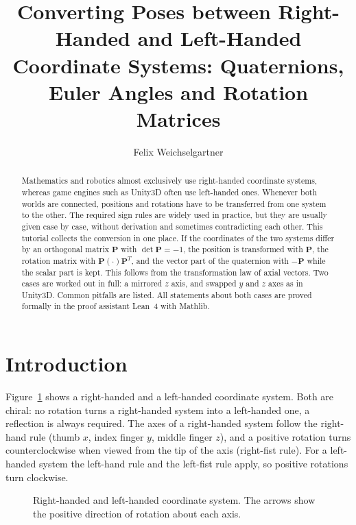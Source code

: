 \documentclass{article}
\title{Converting Poses between Right-Handed and Left-Handed Coordinate Systems: Quaternions, Euler Angles and Rotation Matrices}
\author{Felix Weichselgartner}
\date{}
\theoremstyle{plain}
\theoremstyle{definition}
\newcommand{\vect}[1]{\boldsymbol{#1}}
\newcommand{\coordframe}[8]{%
  \begin{scope}[scale=1.5, x={#1}, y={#2}, z={#3}]
    \draw[axis] (0,0,0) -- (1.8,0,0) node[pos=1.07, black] {$x$};
    \draw[axis] (0,0,0) -- (0,1.8,0) node[pos=1.07, black] {$y$};
    \draw[axis] (0,0,0) -- (0,0,1.8) node[pos=1.07, black] {$z$};
    \draw[rot] plot[domain=35:315, smooth, samples=40, variable=\t]
      ({1.25}, {0.32*cos(\t)}, {0.32*sin(\t)});
    \draw[rot] plot[domain=35:315, smooth, samples=40, variable=\t]
      ({0.32*sin(\t)}, {1.25}, {0.32*cos(\t)});
    \draw[rot] plot[domain=35:315, smooth, samples=40, variable=\t]
      ({0.32*cos(\t)}, {0.32*sin(\t)}, {1.25});
    \node[angle] at ({1.25}, {0.6*cos(215)}, {0.6*sin(215)}) {#5};
    \node[angle] at ({0.6*sin(215)}, {1.25}, {0.6*cos(215)}) {#6};
    \node[angle] at ({0.6*cos(215)}, {0.6*sin(215)}, {1.25}) {#7};
  \end{scope}
  \node[font=\bfseries\small] at (1.4,#8) {#4};
}
\begin{document}
\maketitle

\begin{abstract}
Mathematics and robotics almost exclusively use right-handed coordinate systems, whereas
game engines such as Unity3D often use left-handed ones. Whenever both worlds are connected,
positions and rotations have to be transferred from one system to the other. The required
sign rules are widely used in practice, but they are usually given case by case, without
derivation and sometimes contradicting each other. This tutorial collects the conversion in one
place. If the coordinates of the two systems differ by an orthogonal matrix $\vect P$ with
$\det \vect P = -1$, the position is transformed with $\vect P$, the rotation matrix with
$\vect P(\cdot)\vect P^T$, and the vector part of the quaternion with $-\vect P$ while the scalar
part is kept. This follows from the transformation law of axial vectors. Two cases are worked out
in full: a mirrored $z$ axis, and swapped $y$ and $z$ axes as in Unity3D. Common pitfalls are
listed. All statements about both cases are proved formally in the proof assistant Lean~4 with
Mathlib.
\end{abstract}


\section{Introduction}\label{sec:intro}

Figure~\ref{fig:handedness} shows a right-handed and a left-handed coordinate system. Both are
chiral: no rotation turns a right-handed system into a left-handed one, a reflection is always
required. The axes of a right-handed system follow the right-hand rule (thumb $x$, index finger
$y$, middle finger $z$), and a positive rotation turns counterclockwise when viewed from the tip
of the axis (right-fist rule). For a left-handed system the left-hand rule and the left-fist rule
apply, so positive rotations turn clockwise.

\begin{figure}[H]
  \centering
  \caption{Right-handed and left-handed coordinate system. The arrows show the positive
  direction of rotation about each axis.}
  \label{fig:handedness}
\end{figure}
\end{document}
